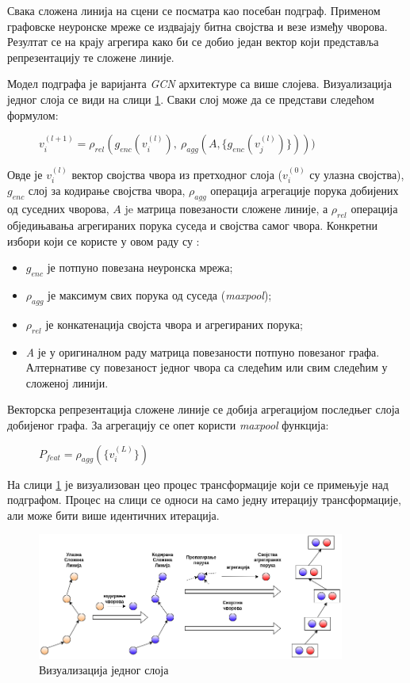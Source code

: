 \documentclass[11pt,oneside]{memoir}
\begin{document}
Свака сложена линија на сцени се посматра као посебан подграф. Применом графовске неуронске мреже
се издвајају битна својства и везе између чворова. Резултат се на крају агрегира како би се добио један вектор који представља репрезентацију те сложене линије.

Модел подграфа је варијанта \textit{GCN} архитектуре \cite{gcn} са више слојева. Визуализација једног слоја се види на слици \ref{vectornet-subgraph}. 
Сваки слој може да се представи следећом формулом:

\begin{figure}[H]
  \centering
  $v^{(l+1)}_{i} = \rho_{rel}(g_{enc}(v^{(l)}_{i}),\ \rho_{agg}(A, \{g_{enc}(v^{(l)}_{j})\})))$
\end{figure}

Овде је $v^{(l)}_{i}$ вектор својства чвора из претходног слоја ($v^{(0)}_{i}$ су улазна својства), $g_{enc}$ слој за кодирање
својства чвора, $\rho_{agg}$ операција агрегације порука добијених од суседних чворова, $A$ je матрица повезаности сложене линије, 
а $\rho_{rel}$ операција обједињавања агрегираних порука суседа и својства самог чвора. Конкретни избори
који се користе у овом раду су \cite{vectornet}:
\begin{itemize}
  \item $g_{enc}$ је потпуно повезана неуронска мрежа;
  \item $\rho_{agg}$ је максимум свих порука од суседа (\textit{maxpool});
  \item $\rho_{rel}$ је конкатенација својста чвора и агрегираних порука;
  \item \textit{A} је у оригиналном раду матрица повезаности потпуно повезаног графа. Алтернативе су повезаност једног чвора са следећим 
  или свим следећим у сложеној линији. 
\end{itemize}

\noindent Векторска репрезентација сложене линије
се добија агрегацијом последњег слоја добијеног графа. За агрегацију се опет користи \textit{maxpool} функција:

\begin{figure}[H]
  \centering
  $P_{feat} = \rho_{agg}(\{v^{(L)}_{i}\})$
\end{figure}

На слици \ref{vectornet-subgraph} је визуализован цео процес трансформације који се примењује над подграфом. Процес на слици се односи на само
једну итерацију трансформације, али може бити више идентичних итерација.

\begin{figure}[H]
  \centering
  \includegraphics[width=0.9\textwidth]{images/vectornet-subgraph-rs.drawio.png}
  \caption{Визуализација једног слоја \label{vectornet-subgraph}}
\end{figure}
\end{document}

